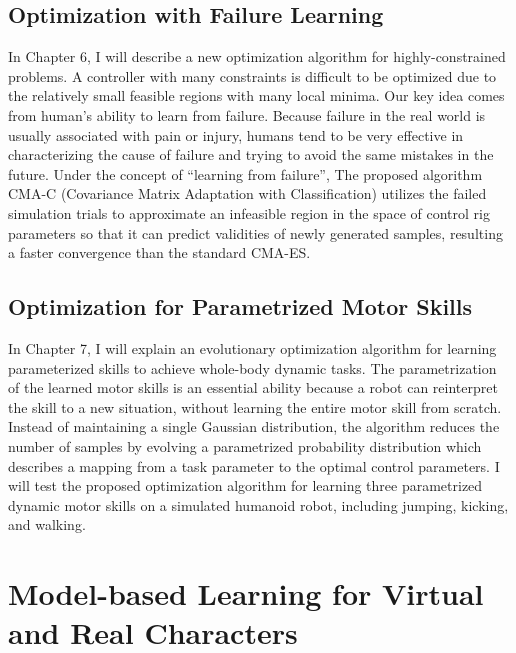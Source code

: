 \subsection{Optimization with Failure Learning}
In Chapter 6, I will describe a new optimization algorithm for
highly-constrained problems.
A controller with many constraints is difficult to be optimized due to the
relatively small feasible regions with many local minima.
Our key idea comes from human’s ability to learn from failure. 
Because failure in the real world is usually associated with pain or injury,
humans tend to be very effective in characterizing the cause of failure and
trying to avoid the same mistakes in the future. 
Under the concept of ``learning from failure'', The proposed algorithm CMA-C
(Covariance Matrix Adaptation with Classification) utilizes the failed
simulation trials to approximate an infeasible region in the space of control
rig parameters so that it can predict validities of newly generated samples,
resulting a faster convergence than the standard CMA-ES.

\subsection{Optimization for Parametrized Motor Skills}
In Chapter 7, I will explain an evolutionary optimization algorithm for
learning parameterized skills to achieve whole-body dynamic tasks.
The parametrization of the learned motor skills is an essential ability
because a robot can reinterpret the skill to a new situation, without
learning the entire motor skill from scratch.
Instead of maintaining a single Gaussian distribution, 
the algorithm reduces the number of samples by evolving a parametrized
probability distribution which describes a mapping from a task parameter
to the optimal control parameters.
I will test the proposed optimization algorithm for learning three parametrized
dynamic motor skills on a simulated humanoid robot, including jumping,
kicking, and walking. 

\section{Model-based Learning for Virtual and Real Characters}


